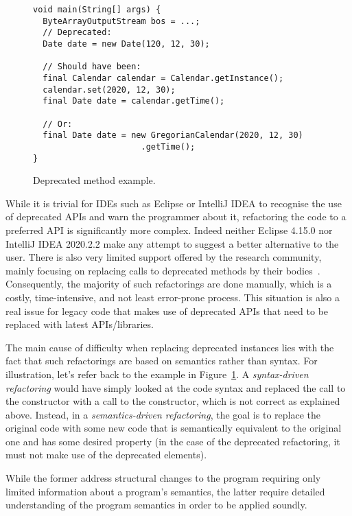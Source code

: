 \documentclass[runningheads,a4paper]{llncs}
\begin{document}
\begin{figure}
\begin{lstlisting}[mathescape=true,showstringspaces=false]
void main(String[] args) {
  ByteArrayOutputStream bos = ...;
  // Deprecated:
  Date date = new Date(120, 12, 30);
 
  // Should have been:
  final Calendar calendar = Calendar.getInstance();
  calendar.set(2020, 12, 30);
  final Date date = calendar.getTime();

  // Or:
  final Date date = new GregorianCalendar(2020, 12, 30)
                      .getTime();
}
\end{lstlisting}
\caption{Deprecated method example.}
\label{ex:deprecated-method}
\end{figure}


While it is trivial for IDEs such as Eclipse or IntelliJ IDEA to
recognise the use of deprecated APIs and warn the programmer about it,
refactoring the code to a preferred API is significantly more
complex. Indeed neither Eclipse 4.15.0 nor IntelliJ IDEA 2020.2.2 make
any attempt to suggest a better alternative to the user. There is also
very limited support offered by the research community, mainly
focusing on replacing calls to deprecated methods by their
bodies~\cite{DBLP:conf/paste/Perkins05}. Consequently, the majority of
such refactorings are done manually, which is a costly,
time-intensive, and not least error-prone process.  This situation is
also a real issue for legacy code that makes use of deprecated APIs
that need to be replaced with latest APIs/libraries.

The main cause of difficulty when replacing deprecated instances lies
with the fact that such refactorings are based on semantics rather
than syntax. For illustration, let's refer back to the example in
Figure~\ref{ex:deprecated-method}.  A {\em syntax-driven refactoring}
would have simply looked at the code syntax and replaced the call to
the  constructor with a call to the 
constructor, which is not correct as explained above. Instead, in a
{\em semantics-driven refactoring}, the goal is to replace the
original code with some new code that is semantically equivalent to
the original one and has some desired property (in the case of the
deprecated refactoring, it must not make use of the deprecated
elements).

While the former address structural changes
to the program requiring only limited information about a program's
semantics, the latter require detailed understanding of the program
semantics in order to be applied soundly.
\end{document}
